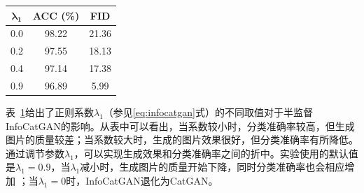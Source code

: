 \begin{table}[htbp]
  \renewcommand\arraystretch{0.7} %
  \centering
  \label{tab:lambda1}
  \begin{tabular}{ccc}
    \toprule
    $\boldsymbol{\lambda_1}$ & \textbf{ACC (\%)} & \textbf{FID} \\
    \midrule
    0.0 & 98.22 & 21.36 \\
    0.2 & 97.55 & 18.13 \\
    0.4 & 97.14 & 17.38 \\
    0.9 & 96.89 & 5.99 \\
    \bottomrule
  \end{tabular}
\end{table}
表~\ref{tab:lambda1}给出了正则系数$\lambda_1$（参见\eqref{eq:infocatgan}式）的不同取值对于半监督InfoCatGAN的影响。从表中可以看出，当系数较小时，分类准确率较高，但生成图片的质量较差；当系数较大时，生成的图片效果很好，但分类准确率有所降低。通过调节参数$\lambda_1$，可以实现生成效果和分类准确率之间的折中。实验使用的默认值是$\lambda_1 = 0.9$，当$\lambda_1$减小时，生成图片的质量开始下降，同时分类准确率也会相应增加 ；当$\lambda_1 = 0$时，InfoCatGAN退化为CatGAN。



